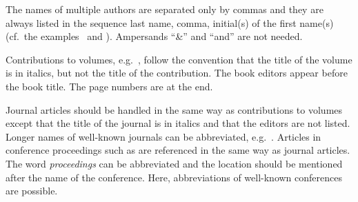 \documentclass[a4paper,11pt,twocolumn]{article}
\begin{document}
The names of multiple authors are separated only by commas and they
are always listed in the sequence last name, comma, initial(s) of the
first name(s) (cf.\ the examples~\cite{Beattie/etal:1982} and
\cite{Peterson/Barney:1952}). Ampersands ``\&'' and ``and'' are not
needed.

Contributions to volumes, e.g.~\cite{Stevens:1999}, follow the
convention that the title of the volume is in italics, but not the
title of the contribution. The book editors appear before the book
title. The page numbers are at the end.

Journal articles should be handled in the same way as contributions to
volumes except that the title of the journal is in italics and that
the editors are not listed. Longer names of well-known journals can be
abbreviated, e.g.~\cite{Peterson/Barney:1952}. Articles in conference proceedings such as \cite{Ladefoged:2003} are
referenced in the same way as journal articles.  The word
\textit{proceedings} can be abbreviated and the location should be
mentioned after the name of the conference. Here, abbreviations of
well-known conferences are possible.




\theendnotes
\end{document}
